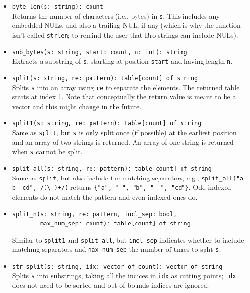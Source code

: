 \documentclass[10pt,landscape]{article}
\begin{document}
\begin{multicols*}{2}
\begin{itemize}
  \item \verb|byte_len(s: string): count|\\
    Returns the number of characters (i.e., bytes) in \texttt{s}.  This
    includes any embedded NULs, and also a trailing NUL, if any (which is why
    the function isn't called \verb|strlen|; to remind the user that Bro
    strings can include NULs).
  \item \verb|sub_bytes(s: string, start: count, n: int): string|\\
    Extracts a substring of \texttt{s}, starting at position \texttt{start} and
    having length \texttt{n}.
  \item \verb|split(s: string, re: pattern): table[count] of string|\\
    Splits \texttt{s} into an array using \texttt{re} to separate the elements.
    The returned table starts at index 1. Note that conceptually the return
    value is meant to be a vector and this might change in the future.
  \item \verb|split1(s: string, re: pattern): table[count] of string|\\
    Same as \texttt{split}, but \texttt{s} is only split once (if possible) at
    the earliest position and an array of two strings is returned. An array of
    one string is returned when \texttt{s} cannot be split.
  \item \verb|split_all(s: string, re: pattern): table[count] of string|\\
    Same as \texttt{split}, but also include the matching separators, e.g.,
    \verb|split_all("a-b--cd", /(\-)+/)| returns
    \verb|{"a", "-", "b", "--", "cd"}|. Odd-indexed elements do not match the
    pattern and even-indexed ones do.
  \item
\begin{verbatim}
split_n(s: string, re: pattern, incl_sep: bool,
        max_num_sep: count): table[count] of string
\end{verbatim}
    Similar to \verb|split1| and \verb|split_all|, but \verb|incl_sep|
    indicates whether to include matching separators and \verb|max_num_sep| the
    number of times to split \texttt{s}.
  \item \verb|str_split(s: string, idx: vector of count): vector of string|\\
    Splits \texttt{s} into substrings, taking all the indices in
    \texttt{idx} as cutting points; \texttt{idx} does not need to be sorted and
    out-of-bounds indices are ignored.

\end{itemize}
\end{multicols*}
\end{document}

